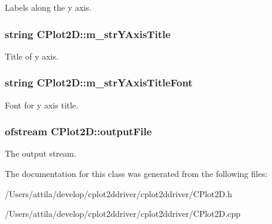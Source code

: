 Labels along the y axis. \hypertarget{class_c_plot2_d_a3d804a8fd4750822429686e4df2263e9}{
\subsubsection[{m\-\_\-str\-Y\-Axis\-Title}]{\setlength{\rightskip}{0pt plus 5cm}string C\-Plot2\-D\-::m\-\_\-str\-Y\-Axis\-Title\hspace{0.3cm}{\ttfamily [protected]}}}\label{class_c_plot2_d_a3d804a8fd4750822429686e4df2263e9}
Title of y axis. \hypertarget{class_c_plot2_d_a584a45f006ede90d11adc58284a8e981}{
\subsubsection[{m\-\_\-str\-Y\-Axis\-Title\-Font}]{\setlength{\rightskip}{0pt plus 5cm}string C\-Plot2\-D\-::m\-\_\-str\-Y\-Axis\-Title\-Font\hspace{0.3cm}{\ttfamily [protected]}}}\label{class_c_plot2_d_a584a45f006ede90d11adc58284a8e981}
Font for y axis title. \hypertarget{class_c_plot2_d_afaca19adeb7c2eced38ce6f7edcd87ec}{
\subsubsection[{output\-File}]{\setlength{\rightskip}{0pt plus 5cm}ofstream C\-Plot2\-D\-::output\-File\hspace{0.3cm}{\ttfamily [protected]}}}\label{class_c_plot2_d_afaca19adeb7c2eced38ce6f7edcd87ec}
The output stream. 

The documentation for this class was generated from the following files\-:\begin{DoxyCompactItemize}
\item 
/\-Users/attila/develop/cplot2ddriver/cplot2ddriver/C\-Plot2\-D.\-h\item 
/\-Users/attila/develop/cplot2ddriver/cplot2ddriver/C\-Plot2\-D.\-cpp\end{DoxyCompactItemize}
